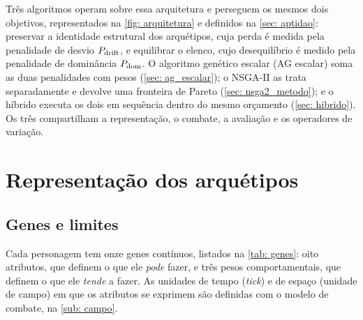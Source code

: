 \begin{figure}[htb]
    \source
\end{figure}

Três algoritmos operam sobre essa arquitetura e perseguem os mesmos dois objetivos, representados na \autoref{fig: arquitetura} e definidos na \autoref{sec: aptidao}: preservar a identidade estrutural dos arquétipos, cuja perda é medida pela penalidade de desvio $P_{\mathrm{drift}}$, e equilibrar o elenco, cujo desequilíbrio é medido pela penalidade de dominância $P_{\mathrm{dom}}$. O algoritmo genético escalar (AG escalar) soma as duas penalidades com pesos (\autoref{sec: ag_escalar}); o NSGA-II as trata separadamente e devolve uma fronteira de Pareto (\autoref{sec: nsga2_metodo}); e o híbrido executa os dois em sequência dentro do mesmo orçamento (\autoref{sec: hibrido}). Os três compartilham a representação, o combate, a avaliação e os operadores de variação.

\section{Representação dos arquétipos}
\label{sec: representacao}

\subsection{Genes e limites}
\label{sub: genes}

Cada personagem tem onze genes contínuos, listados na \autoref{tab: genes}: oito atributos, que definem o que ele \textit{pode} fazer, e três pesos comportamentais, que definem o que ele \textit{tende} a fazer. As unidades de tempo (\textit{tick}) e de espaço (unidade de campo) em que os atributos se exprimem são definidas com o modelo de combate, na \autoref{sub: campo}.

